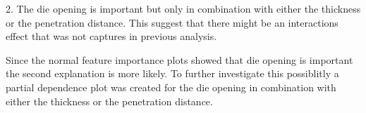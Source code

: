 2. The die opening is important but only in combination with either the thickness or the penetration distance.
This suggest that there might be an interactions effect that was not captures in previous analysis.

Since the normal feature importance plots showed that die opening is important the second explanation is more likely.
To further investigate this possiblitly a partial dependence plot was created for the die opening in combination with
either the thickness or the penetration distance.

\begin{table}[h]
    \begin{tcolorbox}[arc=0pt,boxrule=0.5pt]
        \centering
        \qquad
    \end{tcolorbox}
    \caption{Permutation feature importance}
    \label{tab:permutation_feature_importance}
\end{table}

